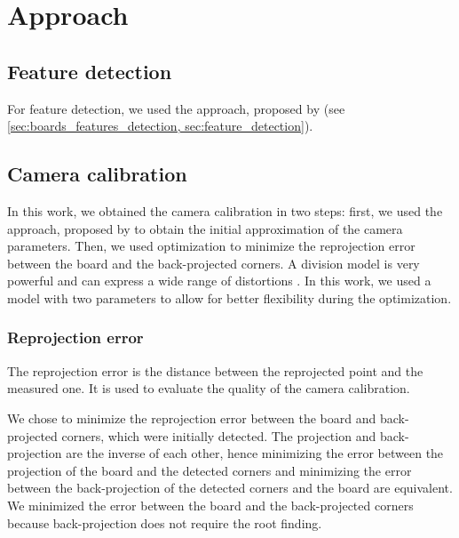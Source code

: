 \chapter{Approach}\label{cha:approach}

\section{Feature detection}\label{sec:feature_detection}

For feature detection, we used the approach, proposed by
\cite{geigerAutomaticCameraRange2012} (see \cref{sec:boards_features_detection,
	sec:feature_detection}).

\section{Camera calibration}\label{sec:camera_calibration}

In this work, we obtained the camera calibration in two steps: first, we
used the approach, proposed by \cite{scaramuzzaToolboxEasilyCalibrating2006} to
obtain the initial approximation of the camera parameters. Then, we used
optimization to minimize the reprojection error between the board and the
back-projected corners. A division model is very powerful and can
express a wide range of distortions
\citep{prittsMinimalSolversRectifying2021}. In this work, we used a model with
two parameters to allow for better flexibility during the optimization.

\subsection{Reprojection error}\label{sub:reprojection_error}

The reprojection error is the distance between the reprojected point and the
measured one. It is used to evaluate the quality of the camera calibration.

We chose to minimize the reprojection error between the board and back-projected
corners, which were initially detected. The projection and back-projection are
the inverse of each other, hence minimizing the error between the projection of
the board and the detected corners and minimizing the error between the
back-projection of the detected corners and the board are
equivalent. We minimized the error
between the board and the back-projected corners because back-projection does
not require the root finding.

